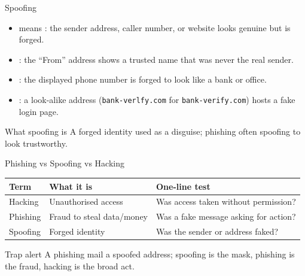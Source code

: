 \documentclass[aspectratio=169]{beamer}
\begin{document}
\begin{frame}{Spoofing}
  \begin{itemize}
    \item {} means : the sender
      address, caller number, or website looks genuine but is forged.
    \item {}: the ``From'' address shows a trusted
      name that was never the real sender.
    \item {}: the displayed phone number is
      forged to look like a bank or office.
    \item {}: a look-alike address
      (\texttt{bank-verlfy.com} for \texttt{bank-verify.com}) hosts a
      fake login page.
  \end{itemize}
  \begin{block}{What spoofing is}
    A forged identity used as a disguise; phishing often 
    spoofing to look trustworthy.
  \end{block}
\end{frame}

\begin{frame}{Phishing vs Spoofing vs Hacking}
  \begin{center}
    \begin{tabular}{lll}
      \toprule
      \textbf{Term} & \textbf{What it is} & \textbf{One-line test} \\
      \midrule
      Hacking & Unauthorised access & Was access taken without permission? \\
      Phishing & Fraud to steal data/money & Was a fake message asking for action? \\
      Spoofing & Forged identity & Was the sender or address faked? \\
      \bottomrule
    \end{tabular}
  \end{center}
  \vspace{0.35cm}
  \begin{alertblock}{Trap alert}
    A phishing mail  a spoofed address; spoofing is the mask,
    phishing is the fraud, hacking is the broad act.
  \end{alertblock}
\end{frame}
\end{document}

